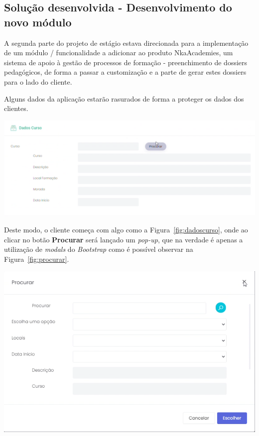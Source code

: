 \subsection{Solução desenvolvida - Desenvolvimento do novo módulo}

A segunda parte do projeto de estágio estava direcionada para a implementação de um módulo / funcionalidade a adicionar ao produto NkaAcademies, um sistema de apoio à gestão de processos de formação - preenchimento de dossiers pedagógicos, de forma a passar a customização e a parte de gerar estes dossiers para o lado do cliente.

Alguns dados da aplicação estarão rasurados de forma a proteger os dados dos clientes.

\begin{center}
        \includegraphics[width=\textwidth,height=\textheight,keepaspectratio]{images/dadoscurso.png}
        \label{fig:dadoscurso}
\end{center}

Deste modo, o cliente começa com algo como a Figura~\ref{fig:dadoscurso}, onde ao clicar no botão \textbf{Procurar} será lançado um \textit{pop-up}, que na verdade é apenas a utilização de \textit{modals} do \textit{Bootstrap} como é possível observar na Figura~\ref{fig:procurar}.

\begin{center}
        \includegraphics[width=\textwidth,height=\textheight,keepaspectratio]{images/procurar.png}
        \label{fig:procurar}
\end{center}

